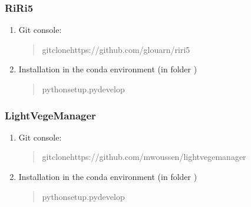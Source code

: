 \documentclass[letterpaper,10pt,english]{sphinxmanual}
\begin{document}
\subsubsection{RiRi5}
\label{\detokenize{installation:riri5}}\begin{enumerate}
%
\item {} 
\sphinxAtStartPar
Git console:
\begin{quote}

\begin{sphinxVerbatim}[commandchars=\\\{\}]
gitclonehttps://github.com/glouarn/riri5
\end{sphinxVerbatim}
\end{quote}

\item {} 
\sphinxAtStartPar
Installation in the conda environment (in folder )
\begin{quote}

\begin{sphinxVerbatim}[commandchars=\\\{\}]
pythonsetup.pydevelop
\end{sphinxVerbatim}
\end{quote}

\end{enumerate}


\subsubsection{LightVegeManager}
\label{\detokenize{installation:lightvegemanager}}\begin{enumerate}
%
\item {} 
\sphinxAtStartPar
Git console:
\begin{quote}

\begin{sphinxVerbatim}[commandchars=\\\{\}]
gitclonehttps://github.com/mwoussen/lightvegemanager
\end{sphinxVerbatim}
\end{quote}

\item {} 
\sphinxAtStartPar
Installation in the conda environment (in folder )
\begin{quote}

\begin{sphinxVerbatim}[commandchars=\\\{\}]
pythonsetup.pydevelop
\end{sphinxVerbatim}
\end{quote}

\end{enumerate}
\end{document}

